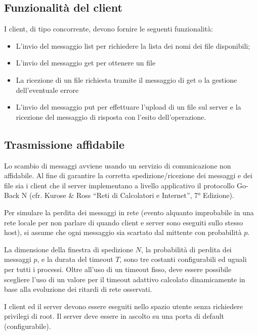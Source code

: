 \subsection{Funzionalità del client}

I client, di tipo concorrente, devono fornire le seguenti funzionalità:

\begin{itemize}
    \item L’invio del messaggio list per richiedere la lista dei nomi dei file
          disponibili;
    \item L’invio del messaggio get per ottenere un file
    \item La ricezione di un file richiesta tramite il messaggio di get o la
          gestione dell’eventuale errore
    \item L’invio del messaggio put per effettuare l’upload di un file sul
          server e la ricezione del messaggio di risposta con l’esito
          dell’operazione.
\end{itemize}

\pagebreak
\subsection{Trasmissione affidabile}

Lo scambio di messaggi avviene usando un servizio di comunicazione non
affidabile. Al fine di garantire la corretta spedizione/ricezione dei messaggi
e dei file sia i client che il server implementano a livello applicativo il
protocollo Go-Back N
(cfr. Kurose \& Ross “Reti di Calcolatori e Internet”, 7° Edizione).

Per simulare la perdita dei messaggi in rete (evento alquanto improbabile in
una rete locale per non parlare di quando client e server sono eseguiti sullo
stesso host), si assume che ogni messaggio sia scartato dal mittente con
probabilità $p$.

La dimensione della finestra di spedizione $N$, la probabilità di perdita dei
messaggi $p$, e la durata del timeout $T$, sono tre costanti configurabili
ed uguali per tutti i processi. Oltre all'uso di un timeout fisso, deve essere
possibile scegliere l'uso di un valore per il timeout adattivo calcolato
dinamicamente in base alla evoluzione dei ritardi di rete osservati.

I client ed il server devono essere eseguiti nello spazio utente senza
richiedere privilegi di root. Il server deve essere in ascolto su una porta
di default (configurabile).
